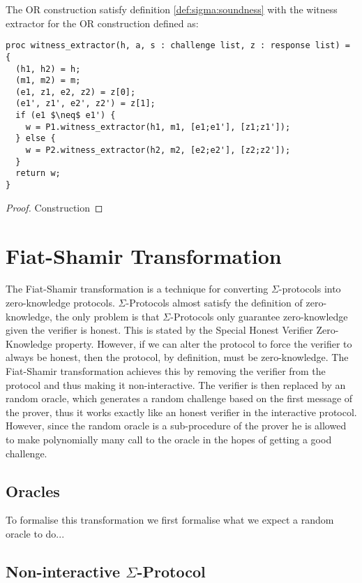 \begin{lemma}
  The OR construction satisfy definition \ref{def:sigma:soundness} with the
  witness extractor for the OR construction defined as:
\begin{lstlisting}[mathescape]
proc witness_extractor(h, a, s : challenge list, z : response list) = {
  (h1, h2) = h;
  (m1, m2) = m;
  (e1, z1, e2, z2) = z[0];
  (e1', z1', e2', z2') = z[1];
  if (e1 $\neq$ e1') {
    w = P1.witness_extractor(h1, m1, [e1;e1'], [z1;z1']);
  } else {
    w = P2.witness_extractor(h2, m2, [e2;e2'], [z2;z2']);
  }
  return w;
}
\end{lstlisting}

\end{lemma}
\begin{proof}
  Construction
\end{proof}

\section{Fiat-Shamir Transformation}
\label{subsec:fiat-shamir}
The Fiat-Shamir transformation is a technique for converting $\Sigma$-protocols
into zero-knowledge protocols. $\Sigma$-Protocols almost satisfy the definition
of zero-knowledge, the only problem is that $\Sigma$-Protocols only guarantee
zero-knowledge given the verifier is honest. This is stated by the Special
Honest Verifier Zero-Knowledge property. However, if we can alter the protocol
to force the verifier to always be honest, then the protocol, by definition,
must be zero-knowledge.
The Fiat-Shamir transformation achieves this by removing the verifier from the
protocol and thus making it non-interactive. The verifier is then replaced by an
random oracle, which generates a random challenge based on the first message of
the prover, thus it works exactly like an honest verifier in the interactive
protocol. However, since the random oracle is a sub-procedure of the prover he
is allowed to make polynomially many call to the oracle in the hopes of getting
a good challenge.

\subsection{Oracles}
\label{subsec:sigma:fiat:oracle}


To formalise this transformation we first formalise what we expect a random
oracle to do...

\subsection{Non-interactive $\Sigma$-Protocol}
\label{subsec:sigma:fiat:protocol}

